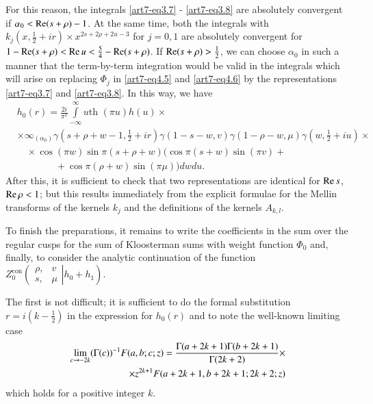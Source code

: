 For this reason, the integrals \eqref{art7-eq3.7} - \eqref{art7-eq3.8} are absolutely convergent if $\alpha_0 < \operatorname{Re} (s + \rho) -1$. At the same time, both the integrals with $k_j (x, \frac{1}{2} + ir) \times x^{2s+ 2 \rho  + 2 u -3}$ for $j =0,1$ are absolutely convergent for $1-\operatorname{Re} (s+ \rho ) < \operatorname{Re} u < \frac{5}{4} - \operatorname{Re} (s+ \rho)$. If $\operatorname{Re} (s+ \rho) > \frac{1}{2}$, we can choose $\alpha_0$ in such a manner that the term-by-term integration would be valid in the integrals which will arise on replacing $\Phi_j$ in \eqref{art7-eq4.5} and \eqref{art7-eq4.6} by the representations \eqref{art7-eq3.7} and \eqref{art7-eq3.8}. In this way, we have 
\begin{align}
& h_0(r) = \frac{2i}{\pi^2} \int\limits^\infty_{-\infty} u \text{th }(\pi u) h (u) \times \\
& \times \infty_{(\alpha_0)} \gamma (s+ \rho+ w -1,\frac{1}{2} + ir) \gamma (1-s-w, v) \gamma (1-\rho - w, \mu) \gamma (w, \frac{1}{2} 
+ iu) \times \\
& \quad \times \cos (\pi w) \sin \pi (s+ \rho + w) (\cos\pi (s+w) \sin (\pi v) +\\
& \qquad \qquad + \cos \pi (\rho + w) \sin (\pi \mu) ) dw du. 
\end{align}
After this, it is sufficient to check that two representations are identical for $\operatorname{Re} s$, $\operatorname{Re} \rho <1$; but this results immediately from the explicit formulae for the Mellin transforms of the kernels $k_j$ and the definitions of the kernels $A_{k,l}$.

To finish the preparations, it remains to write the coefficients in the sum over the regular cusps for the sum of Kloosterman sums with weight function $\Phi_0$ and, finally, to consider the analytic continuation of the function $Z^{\text{con}}_0 
\left(
\left.
\begin{matrix}
\rho, & v \\
s, & \mu 
\end{matrix}
\right| h_0 + h_1
\right)$.

The first is not difficult; it is sufficient to do the formal substitution $r = i (k -\frac{1}{2})$ in the expression for $h_0(r)$ and to note the well-known limiting case
\begin{align}
\lim\limits_{c \to - 2k } (\Gamma (c))^{-1} F (a, b; c; z) = \frac{\Gamma (a+ 2 k + 1) \Gamma (b+ 2 k + 1)}{\Gamma (2k + 2)} \times \label{art7-eq4.14}\\
\times z^{2k + 1} F (a+ 2k + 1, b + 2 k + 1 ; 2 k + 2; z) \notag
\end{align}
which holds for a positive integer $k$.

